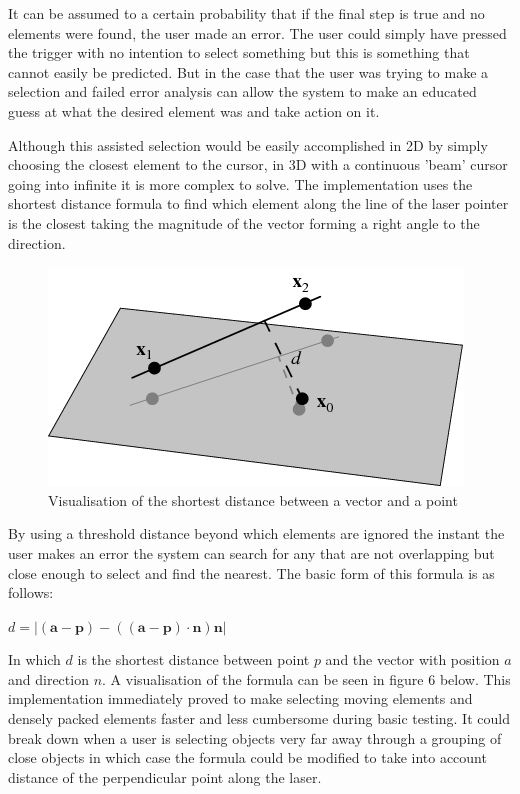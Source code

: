 \documentclass[12pt]{article}
\begin{document}
It can be assumed to a certain probability that if the final step is true and no elements were found, the user made an error. The user could simply have pressed the trigger with no intention to select something but this is something that cannot easily be predicted. But in the case that the user was trying to make a selection and failed error analysis can allow the system to make an educated guess at what the desired element was and take action on it. 

Although this assisted selection would be easily accomplished in 2D by simply choosing the closest element to the cursor, in 3D with a continuous 'beam' cursor going into infinite it is more complex to solve. The implementation uses the shortest distance formula to find which element along the line of the laser pointer is the closest taking the magnitude of the vector forming a right angle to the direction.

\begin{figure}
\centering
  \includegraphics[width=.8\linewidth]{nearestpoint.png}
  \caption{Visualisation of the shortest distance between a vector and a point}
\end{figure}

By using a threshold distance beyond which elements are ignored the instant the user makes an error the system can search for any that are not overlapping but close enough to select and find the nearest. The basic form of this formula is as follows: 

$d = |(\mathbf{a}-\mathbf{p}) - ((\mathbf{a}-\mathbf{p}) \cdot  \mathbf{n})\mathbf{n}|$

In which $d$ is the shortest distance between point $p$ and the vector with position $a$ and direction $n$. A visualisation of the formula can be seen in figure 6 below. This implementation immediately proved to make selecting moving elements and densely packed elements faster and less cumbersome during basic testing. It could break down when a user is selecting objects very far away through a grouping of close objects in which case the formula could be modified to take into account distance of the perpendicular point along the laser.
\end{document}

